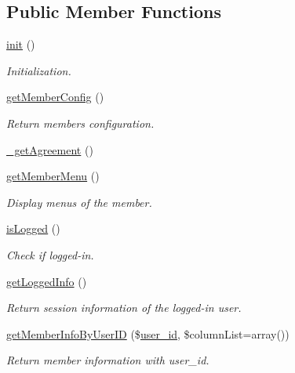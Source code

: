 \subsection*{Public Member Functions}
\begin{DoxyCompactItemize}
\item 
\hyperlink{classmemberModel_ae809c0b0f1c10e0352ad65e7df2a1ac9}{init} ()
\begin{DoxyCompactList}\small\item\em Initialization. \end{DoxyCompactList}\item 
\hyperlink{classmemberModel_a063f34e0a57f8e1c2737318ecd6db8c7}{get\+Member\+Config} ()
\begin{DoxyCompactList}\small\item\em Return member\textquotesingle{}s configuration. \end{DoxyCompactList}\item 
\hyperlink{classmemberModel_a77fb03f9f26568731dfad78b0b1572dd}{\+\_\+get\+Agreement} ()
\item 
\hyperlink{classmemberModel_acd26b1539d27466b84d16d2be10f82cd}{get\+Member\+Menu} ()
\begin{DoxyCompactList}\small\item\em Display menus of the member. \end{DoxyCompactList}\item 
\hyperlink{classmemberModel_a1cae2bd4d961fc6412281111a1565a3d}{is\+Logged} ()
\begin{DoxyCompactList}\small\item\em Check if logged-\/in. \end{DoxyCompactList}\item 
\hyperlink{classmemberModel_a80179b6ef63e1917514c098df24c6e93}{get\+Logged\+Info} ()
\begin{DoxyCompactList}\small\item\em Return session information of the logged-\/in user. \end{DoxyCompactList}\item 
\hyperlink{classmemberModel_a51229368446fed60d67d3349a0ac305c}{get\+Member\+Info\+By\+User\+I\+D} (\$\hyperlink{ko_8install_8php_a74f1a394389d774e5b4cd5d1d15413f7}{user\+\_\+id}, \$column\+List=array())
\begin{DoxyCompactList}\small\item\em Return member information with user\+\_\+id. \end{DoxyCompactList}\item 

\end{DoxyCompactItemize}
